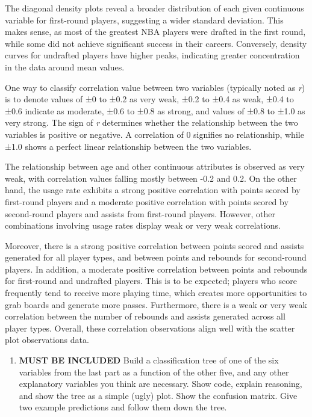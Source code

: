 \documentclass[
]{article}
\providecommand{\tightlist}{%
  \setlength{\itemsep}{0pt}\setlength{\parskip}{0pt}}
\begin{document}
The diagonal density plots reveal a broader distribution of each given
continuous variable for first-round players, suggesting a wider standard
deviation. This makes sense, as most of the greatest NBA players were
drafted in the first round, while some did not achieve significant
success in their careers. Conversely, density curves for undrafted
players have higher peaks, indicating greater concentration in the data
around mean values.

One way to classify correlation value between two variables (typically
noted as \emph{r}) is to denote values of ±0 to ±0.2 as very weak, ±0.2
to ±0.4 as weak, ±0.4 to ±0.6 indicate as moderate, ±0.6 to ±0.8 as
strong, and values of ±0.8 to ±1.0 as very strong. The sign of \emph{r}
determines whether the relationship between the two variables is
positive or negative. A correlation of 0 signifies no relationship,
while ±1.0 shows a perfect linear relationship between the two
variables.

The relationship between age and other continuous attributes is observed
as very weak, with correlation values falling mostly between -0.2 and
0.2. On the other hand, the usage rate exhibits a strong positive
correlation with points scored by first-round players and a moderate
positive correlation with points scored by second-round players and
assists from first-round players. However, other combinations involving
usage rates display weak or very weak correlations.

Moreover, there is a strong positive correlation between points scored
and assists generated for all player types, and between points and
rebounds for second-round players. In addition, a moderate positive
correlation between points and rebounds for first-round and undrafted
players. This is to be expected; players who score frequently tend to
receive more playing time, which creates more opportunities to grab
boards and generate more passes. Furthermore, there is a weak or very
weak correlation between the number of rebounds and assists generated
across all player types. Overall, these correlation observations align
well with the scatter plot observations data.

\vspace{2cm}
\newpage

\begin{enumerate}
\def\labelenumi{\arabic{enumi})}
\setcounter{enumi}{2}
\tightlist
\item
  \textbf{MUST BE INCLUDED} Build a classification tree of one of the
  six variables from the last part as a function of the other five, and
  any other explanatory variables you think are necessary. Show code,
  explain reasoning, and show the tree as a simple (ugly) plot. Show the
  confusion matrix. Give two example predictions and follow them down
  the tree.
\end{enumerate}
\end{document}
